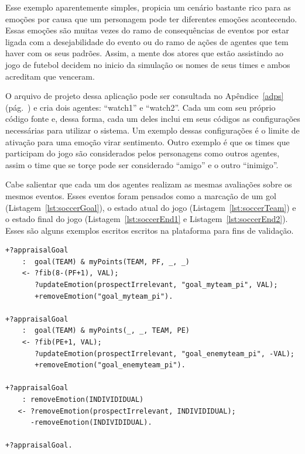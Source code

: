 Esse exemplo aparentemente simples, propicia um cenário bastante rico para as
emoções por causa que um personagem pode ter diferentes emoções acontecendo.
Essas emoções são muitas vezes do ramo de consequências de eventos por
estar ligada com a desejabilidade do evento ou do ramo de ações de agentes que
tem haver com os seus padrões. Assim, a mente dos atores que estão
assistindo ao jogo de futebol decidem no inicio da simulação os nomes de seus
times e ambos acreditam que venceram.

O arquivo de projeto dessa aplicação pode ser consultada no Apêndice~\ref{adps}
(pág.~\pageref{adps}) e cria dois agentes:
``watch1'' e ``watch2''. Cada um com seu próprio código fonte e,
dessa forma, cada um deles inclui em seus códigos as configurações
necessárias para utilizar o sistema. Um exemplo dessas configurações
é o limite de ativação para uma emoção virar sentimento. Outro exemplo é que
os times que participam do jogo são considerados pelos personagens como outros
agentes, assim o time que se torçe pode ser considerado ``amigo'' e o outro
``inimigo''.

Cabe salientar que cada um dos agentes realizam as mesmas avaliações sobre os
mesmos eventos. Esses eventos foram pensados como a marcação de um gol
(Listagem~\ref{lst:soccerGoal}), o estado atual do jogo
(Listagem~\ref{lst:soccerTeam}) e  o estado final do jogo
(Listagem~\ref{lst:soccerEnd1} e Listagem~\ref{lst:soccerEnd2}).
Esses são alguns exemplos escritos escritos na plataforma \jason para
fins de validação.

\begin{center}
    \begin{minipage}{120mm}
	\lstset{linewidth=120mm}
	\begin{lstlisting}[frame=trbl,
caption=Parte do código do agente referente à avaliação de gol,
label=lst:soccerGoal]
+?appraisalGoal
    :  goal(TEAM) & myPoints(TEAM, PF, _, _)
    <- ?fib(8-(PF+1), VAL);
       ?updateEmotion(prospectIrrelevant, "goal_myteam_pi", VAL);
       +removeEmotion("goal_myteam_pi").

+?appraisalGoal
    :  goal(TEAM) & myPoints(_, _, TEAM, PE)
    <- ?fib(PE+1, VAL);
       ?updateEmotion(prospectIrrelevant, "goal_enemyteam_pi", -VAL);
       +removeEmotion("goal_enemyteam_pi").

+?appraisalGoal
    : removeEmotion(INDIVIDIDUAL)
   <- ?removeEmotion(prospectIrrelevant, INDIVIDIDUAL);
      -removeEmotion(INDIVIDIDUAL).

+?appraisalGoal.
	\end{lstlisting}
    \end{minipage}
\end{center}

